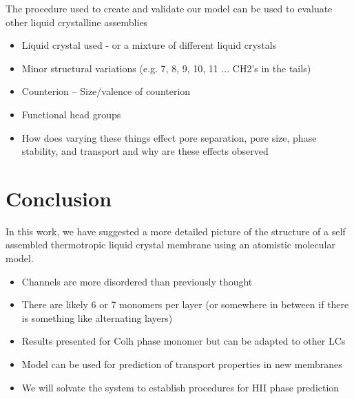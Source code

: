 \documentclass{article}
\begin{document}
	The procedure used to create and validate our model can be used to evaluate other liquid crystalline assemblies
		\begin{itemize}
			\item Liquid crystal used - or a mixture of different liquid crystals
			\item Minor structural variations (e.g. 7, 8, 9, 10, 11 ... CH2's in the tails)
			\item Counterion -- Size/valence of counterion
			\item Functional head groups
			\item How does varying these things effect pore separation, pore size, phase stability, and transport and why are these effects observed
		\end{itemize} 
		
	\section{Conclusion}

	In this work, we have 
suggested 
a more detailed picture of the structure of a self assembled thermotropic liquid crystal membrane using an atomistic molecular model.
	\begin{itemize}
		\item Channels are more disordered than previously thought 
		\item There are likely 6 or 7 monomers per layer (or somewhere in between if there is something like alternating layers)
		\item Results presented for Colh phase monomer but can be adapted to other LCs
		\item Model can be used for prediction of transport properties in new membranes
		\item We will solvate the system to establish procedures for HII phase prediction
	\end{itemize}


	
\end{document}
